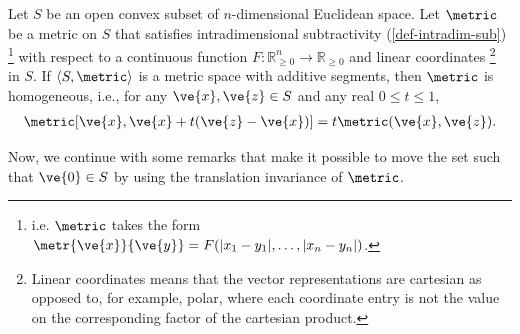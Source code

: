 \begin{thm} \label{thm-homogeneity}
  Let $S$ be an open convex subset of $n$-dimensional Euclidean space. Let $\metric$ be a metric on $S$ that satisfies intradimensional subtractivity (\cref{def-intradim-sub}) \footnote{i.e. $\metric$ takes the form $\metr{\ve{x}}{\ve{y}} = F(|x_1 - y_1|, \dots, |x_n - y_n|)$.} with respect to a continuous function $F: \mathbb{R}_{\geq 0}^n \rightarrow \mathbb{R}_{\geq 0}$ and linear coordinates \footnote{Linear coordinates means that the vector representations are cartesian as opposed to, for example, polar, where each coordinate entry is not the value on the corresponding factor of the cartesian product.} in $S$. If $\langle S, \metric \rangle$ is a metric space with additive segments, then $\metric$ is homogeneous, i.e., for any $\ve{x}, \ve{z} \in S$ and any real $0 \leq t \leq 1$,
	\begin{align*}
    \metric[\ve{x}, \ve{x} + t(\ve{z} - \ve{x})] = t\metric(\ve{x}, \ve{z}).
	\end{align*}
\end{thm}
Now, we continue with some remarks that make it possible to move the set such that $\ve{0} \in S$ by using the translation invariance of $\metric$.

